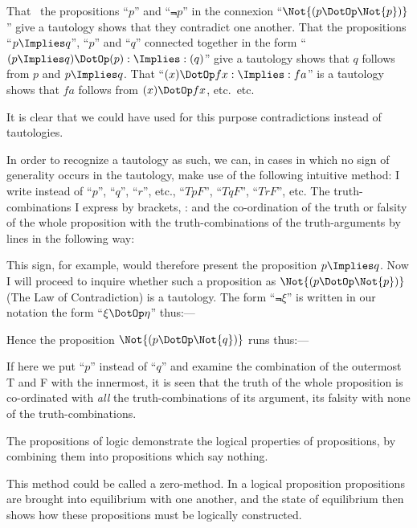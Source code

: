 {That \exempliGratia\ the propositions ``$p$'' and ``$\Not{p}$'' in
the connexion ``$\Not{(p \DotOp \Not{p})}$'' give a tautology
shows that they contradict one another. That the
propositions ``$p \Implies q$'', ``$p$'' and ``$q$'' connected
together in the form ``$(p \Implies q) \DotOp (p) : \Implies : (q)$'' give a
tautology shows that $q$ follows from $p$ and $p \Implies q$.
That ``$(x) \DotOp fx : \Implies : fa$'' is a tautology shows that
$fa$ follows from $(x) \DotOp fx$, etc.\ etc.}


{It is clear that we could have used for this
purpose contradictions instead of tautologies.}


{In order to recognize a tautology as such, we
can, in cases in which no sign of generality occurs
in the tautology, make use of the following intuitive
method: I write instead of ``$p$'', ``$q$'', ``$r$'', etc.,
``$TpF$'', ``$TqF$'', ``$TrF$'', etc. The truth-combinations
I express by brackets, \exempliGratia:
and the co-ordination of the truth or falsity of the
whole proposition with the truth-combinations of
the truth-arguments by lines in the following way:

This sign, for example, would therefore present
the proposition $p \Implies q$. Now I will proceed
to inquire whether such a proposition as $\Not{(p \DotOp \Not{p})}$
(The Law of Contradiction) is a tautology. The
form ``$\Not{\xi}$'' is written in our notation
the form ``$\xi \DotOp \eta$'' thus:---
\enlargethispage{-29pt} %

Hence the proposition $\Not{(p \DotOp \Not{q})}$ runs thus:---

If here we put ``$p$'' instead of ``$q$'' and examine
the combination of the outermost T and F with the
innermost, it is seen that the truth of the whole
proposition is co-ordinated with \emph{all} the truth-combinations
of its argument, its falsity with none of
the truth-combinations.}


{The propositions of logic demonstrate the logical
properties of propositions, by combining them into
propositions which say nothing.

This method could be called a zero-method. In
a logical proposition propositions are brought into
equilibrium with one another, and the state of
equilibrium then shows how these propositions
must be logically constructed.}


